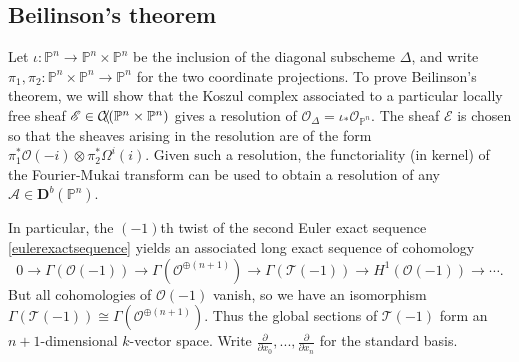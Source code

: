 \documentclass[a4paper]{article}
\theoremstyle{definition}
\theoremstyle{remark}
\newcommand{\deri}{\mathbf{D}}
\newcommand{\Pn}{\ensuremath{{\mathbb{P}^n}}}
\DeclareMathOperator{\coh}{\mathcal{C\kern -2pt o\kern -2pt h\kern -1pt}}
\begin{document}
\subsection{Beilinson's theorem}

Let \(\iota: \Pn \rightarrow \Pn\times \Pn\) be the inclusion of the diagonal
subscheme \(\Delta\), and write \(\pi_1, \pi_2:\Pn \times \Pn \rightarrow \Pn\)
for the two coordinate projections. To prove Beilinson's theorem, we will show
that the Koszul complex associated to a particular locally free sheaf
\(\mathscr{E}\in \coh (\Pn\times \Pn)\) gives a resolution of
\(\mathscr{O}_\Delta =\iota_\ast \mathscr{O}_\Pn\). The sheaf \(\mathscr{E}\) is
chosen so that the sheaves arising in the resolution are of the form
\(\pi_1^\ast\mathscr{O}(-i)\otimes \pi_2^\ast\Omega^i(i)\). Given such a
resolution, the functoriality (in kernel) of the Fourier-Mukai transform can be
used to obtain a resolution of any \(\mathscr{A}\in\deri^b(\Pn)\).

In particular, the \((-1)\)th twist of the second Euler
exact sequence \eqref{eulerexactsequence} yields an associated long exact
sequence of cohomology
\[0\rightarrow \Gamma(\mathscr{O}(-1)) \rightarrow
    \Gamma(\mathscr{O}^{\oplus(n+1)}) \rightarrow \Gamma(\mathscr{T}(-1))
    \rightarrow H^1(\mathscr{O}(-1)) \rightarrow \cdots.\] 
But all cohomologies of \(\mathscr{O}(-1)\) vanish, so we have an isomorphism
\(\Gamma(\mathscr{T}(-1))\cong \Gamma(\mathscr{O}^{\oplus(n+1)})\). Thus the
global sections of \(\mathscr{T}(-1)\) form an \(n+1\)-dimensional \(k\)-vector
space. Write \(\frac{\partial}{\partial x_0},...,\frac{\partial}{\partial x_n}\)
for the standard basis.
\end{document}

